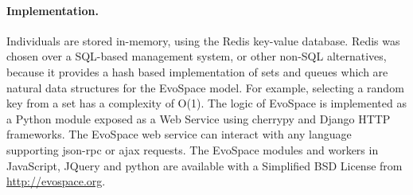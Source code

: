 \documentclass{llncs}
\begin{document}
\paragraph{Implementation.}
Individuals are stored in-memory, using the Redis key-value database.
Redis was chosen over a SQL-based management system, or other non-SQL alternatives, because it provides a hash based implementation of sets and queues which are natural data structures for the EvoSpace model. For example, selecting a random key from a set has a complexity of O(1). The logic of EvoSpace is implemented as a Python module exposed as a Web Service using cherrypy and Django HTTP frameworks. The EvoSpace web service can interact with any language supporting json-rpc or ajax requests. The EvoSpace modules and workers in JavaScript, JQuery and python are available with a Simplified BSD License from \url{http://evospace.org}.
\end{document}
